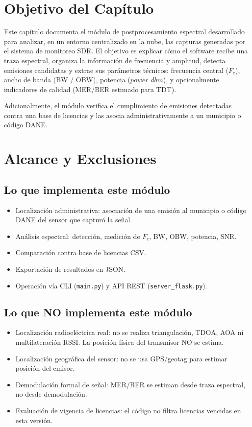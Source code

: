 \section{Objetivo del Capítulo}

Este capítulo documenta el módulo de postprocesamiento espectral desarrollado para analizar, en un entorno centralizado en la nube, las capturas generadas por el sistema de monitoreo SDR. El objetivo es explicar cómo el software recibe una traza espectral, organiza la información de frecuencia y amplitud, detecta emisiones candidatas y extrae sus parámetros técnicos: frecuencia central ($F_c$), ancho de banda (BW / OBW), potencia ($power\_dbm$), y opcionalmente indicadores de calidad (MER/BER estimado para TDT).

Adicionalmente, el módulo verifica el cumplimiento de emisiones detectadas contra una base de licencias y las asocia administrativamente a un municipio o código DANE.

\section{Alcance y Exclusiones}

\subsection{Lo que implementa este módulo}

\begin{itemize}
\item Localización administrativa: asociación de una emisión al municipio o código DANE del sensor que capturó la señal.
\item Análisis espectral: detección, medición de $F_c$, BW, OBW, potencia, SNR.
\item Comparación contra base de licencias CSV.
\item Exportación de resultados en JSON.
\item Operación vía CLI (\texttt{main.py}) y API REST (\texttt{server\_flask.py}).
\end{itemize}

\subsection{Lo que NO implementa este módulo}

\begin{itemize}
\item Localización radioeléctrica real: no se realiza triangulación, TDOA, AOA ni multilateración RSSI. La posición física del transmisor NO se estima.
\item Localización geográfica del sensor: no se usa GPS/geotag para estimar posición del emisor.
\item Demodulación formal de señal: MER/BER se estiman desde traza espectral, no desde demodulación.
\item Evaluación de vigencia de licencias: el código no filtra licencias vencidas en esta versión.
\end{itemize}

